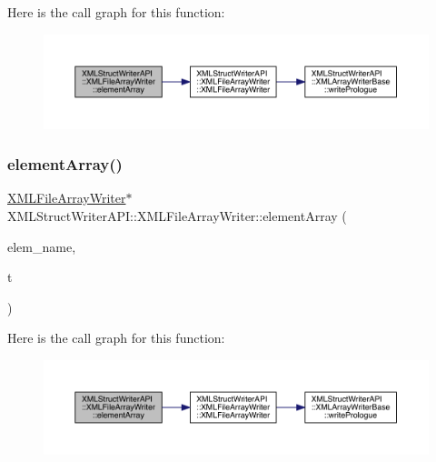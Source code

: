 Here is the call graph for this function\+:
\nopagebreak
\begin{figure}[H]
\begin{center}
\leavevmode
\includegraphics[width=350pt]{d1/d9d/classXMLStructWriterAPI_1_1XMLFileArrayWriter_afc24054ffb39df378f8aeb77e029bd59_cgraph}
\end{center}
\end{figure}
\mbox{\label{classXMLStructWriterAPI_1_1XMLFileArrayWriter_ad455da07ae5725cffdab8b056681ec2d}} 
\subsubsection{\texorpdfstring{elementArray()}{elementArray()}\hspace{0.1cm}{\footnotesize\ttfamily [4/6]}}
{\footnotesize\ttfamily \mbox{\hyperlink{classXMLStructWriterAPI_1_1XMLFileArrayWriter}{X\+M\+L\+File\+Array\+Writer}}$\ast$ X\+M\+L\+Struct\+Writer\+A\+P\+I\+::\+X\+M\+L\+File\+Array\+Writer\+::element\+Array (\begin{DoxyParamCaption}\item[{const std\+::string \&}]{elem\+\_\+name,  }\item[{\mbox{\hyperlink{namespaceXMLStructWriterAPI_a2017208be87c77a32bdc19ea2f14d032}{Array\+Type}}}]{t }\end{DoxyParamCaption})\hspace{0.3cm}{\ttfamily [inline]}}

Here is the call graph for this function\+:
\nopagebreak
\begin{figure}[H]
\begin{center}
\leavevmode
\includegraphics[width=350pt]{d1/d9d/classXMLStructWriterAPI_1_1XMLFileArrayWriter_ad455da07ae5725cffdab8b056681ec2d_cgraph}
\end{center}
\end{figure}
\mbox{\label{classXMLStructWriterAPI_1_1XMLFileArrayWriter_ad455da07ae5725cffdab8b056681ec2d}} 
